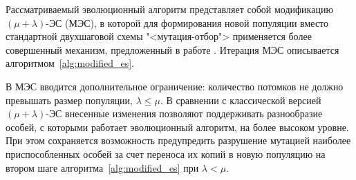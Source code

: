 \documentclass[12pt]{article}
\begin{document}
Рассматриваемый эволюционный алгоритм представляет собой модификацию 
$(\mu + \lambda)$-ЭС (МЭС), в которой для формирования новой популяции вместо 
стандартной двухшаговой схемы "<мутация-отбор"> применяется более совершенный 
механизм, предложенный в работе 
\cite[с.~62]{bib:michalewicz98}.
Итерация МЭС описывается алгоритмом~\ref{alg:modified_es}.

В МЭС вводится дополнительное 
ограничение: количество потомков не должно превышать размер популяции, 
$\lambda \leq \mu$. В сравнении с классической версией $(\mu + \lambda)$-ЭС 
внесенные изменения позволяют поддерживать разнообразие особей, с которыми 
работает эволюционный алгоритм, на более высоком уровне. При этом сохраняется 
возможность предупредить разрушение мутацией наиболее приспособленных особей 
за счет переноса их копий в новую популяцию на втором шаге 
алгоритма~\ref{alg:modified_es}
при $\lambda<\mu$.
\end{document}
